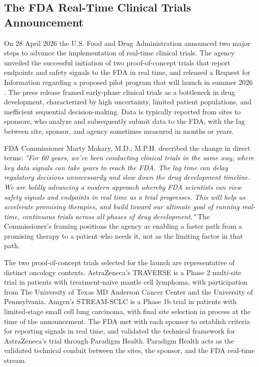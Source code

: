 
\subsection{The FDA Real-Time Clinical Trials Announcement}
\label{sec:intro-fda}

On 28 April 2026 the U.S. Food and Drug Administration announced two
major steps to advance the implementation of real-time clinical trials.
The agency unveiled the successful initiation of two proof-of-concept
trials that report endpoints and safety signals to the FDA in real
time, and released a Request for Information regarding a proposed pilot
program that will launch in summer 2026 \cite{fda2026realtime}. The
press release framed early-phase clinical trials as a bottleneck in
drug development, characterized by high uncertainty, limited patient
populations, and inefficient sequential decision-making. Data is
typically reported from sites to sponsors, who analyze and subsequently
submit data to the FDA, with the lag between site, sponsor, and agency
sometimes measured in months or years.

FDA Commissioner Marty Makary, M.D., M.P.H. described the change in
direct terms: \emph{"For 60 years, we've been conducting clinical trials
in the same way, where key data signals can take years to reach the
FDA. The lag time can delay regulatory decisions unnecessarily and slow
down the drug development timeline. We are boldly advancing a modern
approach whereby FDA scientists can view safety signals and endpoints
in real time as a trial progresses. This will help us accelerate
promising therapies, and build toward our ultimate goal of running
real-time, continuous trials across all phases of drug development."}
The Commissioner's framing positions the agency as enabling a faster
path from a promising therapy to a patient who needs it, not as the
limiting factor in that path.

The two proof-of-concept trials selected for the launch are
representative of distinct oncology contexts. AstraZeneca's TRAVERSE
is a Phase 2 multi-site trial in patients with treatment-naive mantle
cell lymphoma, with participation from The University of Texas MD
Anderson Cancer Center and the University of Pennsylvania. Amgen's
STREAM-SCLC is a Phase 1b trial in patients with limited-stage small
cell lung carcinoma, with final site selection in process at the time
of the announcement. The FDA met with each sponsor to establish
criteria for reporting signals in real time, and validated the
technical framework for AstraZeneca's trial through Paradigm Health.
Paradigm Health acts as the validated technical conduit between the
sites, the sponsor, and the FDA real-time stream.


